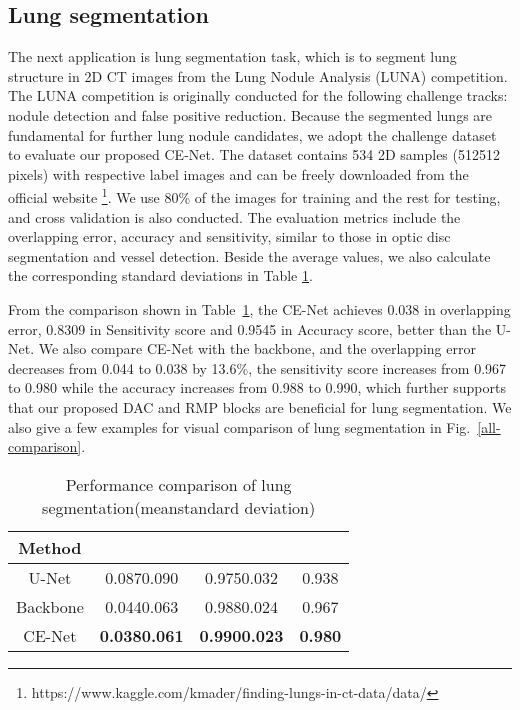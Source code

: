 \documentclass[journal]{IEEEtran}
\begin{document}
\subsection{Lung segmentation}
The next application is lung segmentation task, which is to segment lung structure in 2D CT images from the Lung Nodule Analysis (LUNA) competition. The LUNA competition is originally conducted for the following challenge tracks: nodule detection and false positive reduction.
Because the segmented lungs are fundamental for further lung nodule candidates, we adopt the challenge dataset to evaluate our proposed CE-Net. The dataset contains 534 2D samples (512512 pixels) with respective label images and can be freely downloaded from the official website \footnote{https://www.kaggle.com/kmader/finding-lungs-in-ct-data/data/}. We use 80\% of the images for training and the rest for testing, and cross validation is also conducted. The evaluation metrics include the overlapping error, accuracy and sensitivity, similar to those in optic disc segmentation and vessel detection. Beside the average values, we also calculate the corresponding standard deviations in Table \ref{lung}.

From the comparison shown in Table~\ref{lung}, the CE-Net achieves 0.038 in overlapping error, 0.8309 in Sensitivity score and 0.9545 in Accuracy score, better than the U-Net. We also compare CE-Net with the backbone, and the overlapping error decreases from 0.044 to 0.038 by 13.6\%, the sensitivity score increases from 0.967 to 0.980 while the accuracy increases from 0.988 to 0.990, which further supports that our proposed DAC and RMP blocks are beneficial for lung segmentation. We also give a few examples for visual comparison of lung segmentation in Fig.~\ref{all-comparison}.

\begin{table}[h] 
	\normalsize
	\caption{Performance comparison of lung segmentation(meanstandard deviation)} 
	\centering
\begin{tabular}{c|c|c|c}
\hline
Method   &  &  &  \\ \hline
U-Net \cite{ronneberger2015u}   & 0.0870.090  &  0.9750.032   &  0.938   \\ \hline
Backbone & 0.0440.063  &  0.9880.024   &  0.967  \\ \hline
{CE-Net}   & \textbf{0.0380.061}  & \textbf{0.9900.023}    &  \textbf{0.980}   \\ \hline
\end{tabular}
	\label{lung}
\end{table}
\end{document}
